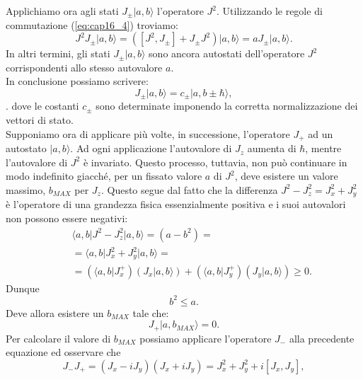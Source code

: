 \documentclass[a4paper,12pt,oneside]{book}
\begin{document}
Applichiamo ora agli stati $ J_{\pm} \vert a, b \rangle$ l'operatore $J^2$. Utilizzando le regole di commutazione (\ref{eq:cap16_4}) troviamo:
\begin{equation}
J^2J_{\pm} \vert a, b \rangle = \left( [J^2,J_{\pm}] + J_{\pm}J^2\right)\vert a, b \rangle = a J_{\pm} \vert a, b \rangle .
\end{equation}
In altri termini, gli stati $J_{\pm} \vert a, b \rangle$ sono ancora autostati dell'operatore $J^2$ corrispondenti allo stesso autovalore $a$.\\
In conclusione possiamo scrivere:
\begin{equation}
J_{\pm} \vert a, b \rangle = c_{\pm}\vert a, b\pm \hbar \rangle,
\label{eq:cap16_5}
\end{equation}.
dove le costanti $c_{\pm}$ sono determinate imponendo la corretta normalizzazione dei vettori di stato.\\
Supponiamo ora di applicare più volte, in successione, l'operatore $J_+$ ad un autostato $\vert a,b \rangle $. Ad ogni applicazione l'autovalore di $J_z$ aumenta di $\hbar$, mentre l'autovalore di $J^2$ è invariato. Questo processo, tuttavia, non può continuare in modo indefinito giacché, per un fissato valore $a$ di $J^2$, deve esistere un valore massimo, $b_{MAX}$ per $J_z$. Questo segue dal fatto che la differenza $J^2-J_z ^2=J_x ^2+J_y ^2$ è l'operatore di una grandezza fisica essenzialmente positiva e i suoi autovalori non possono essere negativi:
\begin{eqnarray}
& &\langle a,b \vert J^2-J_z ^2 \vert a, b \rangle = (a-b^2) = \nonumber \\
& &=\langle a,b \vert J_x ^2+J_y ^2 \vert a, b \rangle = \nonumber \\
& & =\left(\langle a,b \vert J_x ^+\right) \left(J_x \vert a, b \rangle\right)+\left(\langle a,b \vert J_y ^+\right) \left(J_y \vert a, b \rangle\right) \geq 0.
\end{eqnarray}
Dunque
\begin{equation}
b^2 \leq a .
\label{eq:cap16_6}
\end{equation}
Deve allora esistere un $b_{MAX}$ tale che:
\begin{equation}
J_{+} \vert a, b_{MAX} \rangle =0.
\end{equation}
Per calcolare il valore di $b_{MAX}$ possiamo applicare l'operatore $J_-$ alla precedente equazione ed osservare che 
\begin{equation}
J_-J_+ = (J_x-iJ_y)(J_x+iJ_y)= J_x^2 +J_y ^2+i[J_x, J_y] ,
\end{equation}
\end{document}
